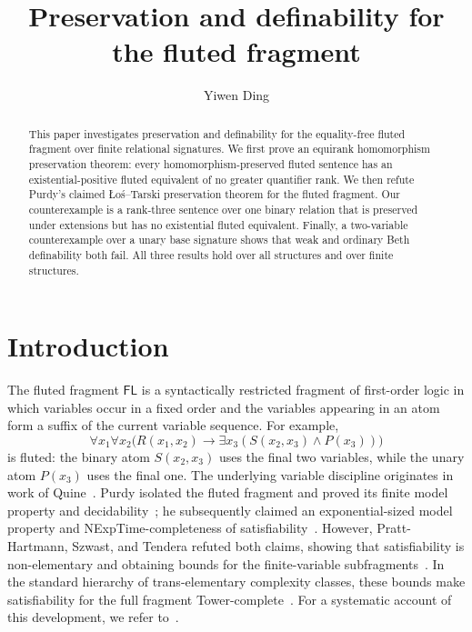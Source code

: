 \documentclass{lmcs}
\newcommand{\FL}{\mathsf{FL}}
\begin{document}
\title[Preservation and definability for the fluted fragment]
{Preservation and definability for the fluted fragment}
\author[Y. Ding]{Yiwen Ding}
\address{School of Business and Economics\\
Vrije Universiteit Amsterdam\\
De Boelelaan 1105\\
1081 HV Amsterdam, The Netherlands}

\begin{abstract}
This paper investigates preservation and definability for the equality-free
fluted fragment over finite relational signatures.  We first prove an
equirank homomorphism preservation theorem: every homomorphism-preserved
fluted sentence has an existential-positive fluted equivalent of no greater
quantifier rank.  We then refute Purdy's claimed
\L o\'s--Tarski preservation theorem for the fluted fragment.  Our counterexample
is a rank-three sentence over one binary relation that is preserved under
extensions but has no existential fluted equivalent.  Finally, a two-variable
counterexample over a unary base signature shows that weak and ordinary Beth
definability both fail.  All three results hold over all structures and over
finite structures.
\end{abstract}
\maketitle

\section{Introduction}\label{sec:introduction}

The fluted fragment $\FL$ is a syntactically restricted fragment of
first-order logic in which variables occur in a fixed order and the variables
appearing in an atom form a suffix of the current variable sequence.  For
example,
\[
  \forall x_1\forall x_2
  \bigl(R(x_1,x_2)\to
        \exists x_3(S(x_2,x_3)\wedge P(x_3))\bigr)
\]
is fluted: the binary atom $S(x_2,x_3)$ uses the final two variables, while
the unary atom $P(x_3)$ uses the final one.  The underlying variable discipline
originates in work of Quine~\cite{Quine1969,Quine1975}.  Purdy isolated the
fluted fragment and proved its finite model property and
decidability~\cite{Purdy1996}; he subsequently claimed an exponential-sized model property
and NExpTime-completeness of satisfiability~\cite{Purdy2002}.  However,
Pratt-Hartmann,
Szwast, and Tendera refuted both claims, showing that satisfiability is
non-elementary and obtaining bounds for the finite-variable
subfragments~\cite{PrattHartmannSzwastTendera2019}.  In the standard hierarchy of
trans-elementary complexity classes, these bounds make satisfiability for the
full fragment Tower-complete~\cite{BednarczykKojelisPrattHartmann2025}.  For a
systematic account of this development, we refer to~\cite{PrattHartmann2023}.
\end{document}
